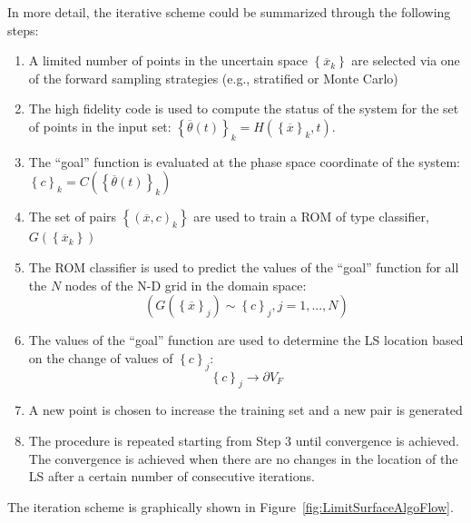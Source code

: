 In more detail, the iterative scheme could be summarized through the following steps:
\begin{enumerate}
  \item A limited number of points in the uncertain space $\left \{ 
  \overline{x}_{k} \right \}$ are selected via one of the forward 
  sampling strategies (e.g., stratified or Monte Carlo)
  \item The high fidelity code is used to compute the status of the 
  system for the set of points in the input set: 
  $
  \left \{ \overline{\theta}(t)\right \}_{k} = H\left ( \left \{ \overline{x} \right 
  \}_{k},t \right )
  $.
  \item The ``goal'' function is evaluated at the phase space coordinate 
  of the system:
  $\left \{ c \right \}_{k} = C\left ( \left \{ \overline{\theta}(t)\right \}_{k} 
  \right )$
   \item The set of pairs $\left \{ \left ( \overline{x},c \right )_{k} \right \}$
   are used to train a ROM of type classifier, $G\left ( \left \{ 
   \overline{x}_{k} \right \} \right )$
   \item The ROM classifier is used to predict the values of the ``goal''  
   function for all the $N$ nodes of the N-D grid in the domain space:
   \begin{equation}
   \left (G\left ( \left \{ \overline{x} \right \}_{j} \right ) \sim \left \{ c \right 
   \}_{j}, j=1,...,N  \right )
    \end{equation}
    \item The values of the ``goal''  function are used to determine the 
    LS location based on the change of values of  $\left \{ c \right 
    \}_{j}$:
    \begin{equation}
    \left \{ c \right \}_{j}\rightarrow \partial V_{F}
     \end{equation}
     \item A new point is chosen to increase the training set and a new 
     pair is generated
     \item The procedure is repeated starting from Step 3 until 
     convergence is achieved. The convergence is achieved when 
     there are no changes in the location of the LS after a certain 
     number of consecutive iterations.
\end{enumerate}
The iteration scheme is graphically shown in 
Figure~\ref{fig:LimitSurfaceAlgoFlow}.
